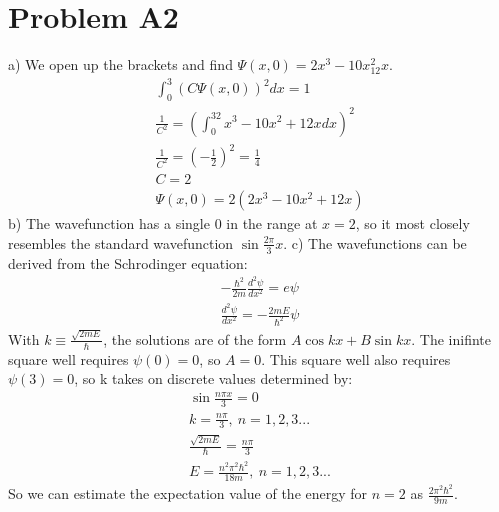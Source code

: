 \documentclass[a4paper,11pt]{article}
\numberwithin{equation}{section}
\begin{document}
\section{Problem A2}
a) We open up the brackets and find $\Psi(x,0) = 2x^3-10x^2_12x$.
\begin{gather}
 \int_0^3(C\Psi(x,0))^2 dx = 1\\
 \frac{1}{C^2}=\left(\int_0^32x^3-10x^2+12x dx \right)^2\\
 \frac{1}{C^2}=(-\frac{1}{2})^2=\frac{1}{4}\\
 C=2\\
 \Psi(x,0) = 2(2x^3-10x^2+12x)
\end{gather}
b) The wavefunction has a single 0 in the range at $x=2$, so it most closely resembles the standard wavefunction $\sin{\frac{2\pi}{3}x}$.
c) The wavefunctions can be derived from the Schrodinger equation:
\begin{gather}
 -\frac{\hbar^2}{2m}\frac{d^2 \psi}{dx^2}=e\psi\\
 \frac{d^2 \psi}{dx^2}=-\frac{2mE}{\hbar^2}\psi
\end{gather}
With $k \equiv \frac{\sqrt{2mE}}{\hbar}$, the solutions are of the form $A\cos{kx}+B\sin{kx}$.
The inifinte square well requires $\psi(0)=0$, so $A=0$.
This square well also requires $\psi(3)=0$, so k takes on discrete values determined by:
\begin{gather}
 \sin{\frac{n\pi x}{3}}=0\\
 k = \frac{n \pi}{3},\ n=1,2,3...\\
 \frac{\sqrt{2mE}}{\hbar}=\frac{n \pi}{3}\\
 E=\frac{n^2\pi^2 \hbar^2}{18m},\ n=1,2,3...
\end{gather}
So we can estimate the expectation value of the energy for $n=2$ as $\frac{2\pi^2\hbar^2}{9m}$.
\\
\end{document}
